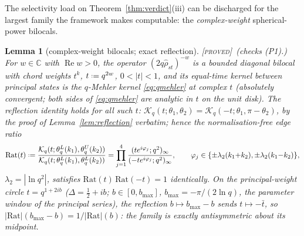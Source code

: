 \documentclass[11pt,a4paper]{article}
\providecommand{\coloneqq}{\mathrel{\vcenter{\baselineskip0.5ex \lineskiplimit0pt
      \hbox{\scriptsize.}\hbox{\scriptsize.}}}=}
\newcommand{\PROVED}{{\color{ForestGreen}\textsc{[proved]}}}
\theoremstyle{definition}
\theoremstyle{plain}
\newtheorem{lemma}[definition]{Lemma}
\newcommand{\C}{\mathbb{C}}
\newcommand{\K}{\mathcal{K}}                    %
\begin{document}

The selectivity load on Theorem~\ref{thm:verdict}(iii) can be discharged for the largest
family the framework makes computable: the \emph{complex-weight} spherical-power bilocals.

\begin{lemma}[complex-weight bilocals; exact reflection]\label{lem:complexweight}
\PROVED\ (checks (P1).) For $w\in\C$ with $\operatorname{Re}w>0$, the operator
$(2q\hat\rho_{st})^{-w}$ is a bounded diagonal bilocal with chord weights $t^{k}$,
$t\coloneqq q^{2w}$, $0<|t|<1$, and its equal-time kernel between principal states is the
$q$-Mehler kernel \eqref{eq:qmehler} at complex $t$ (absolutely convergent; both sides of
\eqref{eq:qmehler} are analytic in $t$ on the unit disk). The reflection identity holds for
\emph{all} such $t$: $\K_{q}(t;\theta_{1},\theta_{2})=\K_{q}(-t;\theta_{1},\pi-\theta_{2})$,
by the proof of Lemma~\ref{lem:reflection} verbatim; hence the normalisation-free
edge ratio
\begin{equation}\label{eq:edgeratio}
  \mathrm{Rat}(t)\coloneqq
  \frac{\K_{q}(t;\theta^{L}_{q}(k_1),\theta^{U}_{q}(k_2))}
       {\K_{q}(t;\theta^{L}_{q}(k_1),\theta^{L}_{q}(k_2))}
  =\prod_{j=1}^{4}
  \frac{(t e^{i\varphi_{j}};q^{2})_{\infty}}{(-t e^{i\varphi_{j}};q^{2})_{\infty}},
  \qquad \varphi_{j}\in\{\pm\lambda_2(k_1{+}k_2),\pm\lambda_2(k_1{-}k_2)\},
\end{equation}
$\lambda_2=|\ln q^{2}|$, satisfies $\mathrm{Rat}(t)\,\mathrm{Rat}(-t)=1$ identically. On
the principal-weight circle $t=q^{1+2ib}$ ($\Delta=\tfrac12+ib$;
$b\in[0,b_{\max}]$, $b_{\max}=-\pi/(2\ln q)$, the parameter window of the principal
series), the reflection $b\mapsto b_{\max}-b$ sends $t\mapsto-\bar t$, so
$|\mathrm{Rat}|(b_{\max}-b)=1/|\mathrm{Rat}|(b)$: the family is exactly antisymmetric
about its midpoint.
\end{lemma}
\end{document}

